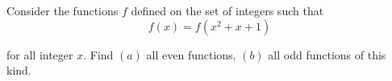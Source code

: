 Consider the functions $f$ defined on the set of integers such that\[f(x)=f(x^2+x+1)\]

for all integer $x$. Find $(a)$ all even functions, $(b)$ all odd functions of this kind.